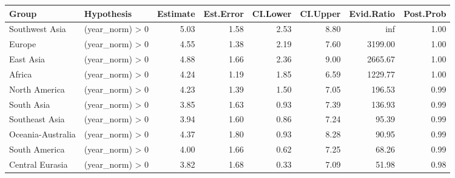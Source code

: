 \begin{tabular}{llrrrrrr}
\toprule
Group & Hypothesis & Estimate & Est.Error & CI.Lower & CI.Upper & Evid.Ratio & Post.Prob \\
\midrule
Southwest Asia & (year_norm) > 0 & 5.03 & 1.58 & 2.53 & 8.80 & inf & 1.00 \\
Europe & (year_norm) > 0 & 4.55 & 1.38 & 2.19 & 7.60 & 3199.00 & 1.00 \\
East Asia & (year_norm) > 0 & 4.88 & 1.66 & 2.36 & 9.00 & 2665.67 & 1.00 \\
Africa & (year_norm) > 0 & 4.24 & 1.19 & 1.85 & 6.59 & 1229.77 & 1.00 \\
North America & (year_norm) > 0 & 4.23 & 1.39 & 1.50 & 7.05 & 196.53 & 0.99 \\
South Asia & (year_norm) > 0 & 3.85 & 1.63 & 0.93 & 7.39 & 136.93 & 0.99 \\
Southeast Asia & (year_norm) > 0 & 3.94 & 1.60 & 0.86 & 7.24 & 95.39 & 0.99 \\
Oceania-Australia & (year_norm) > 0 & 4.37 & 1.80 & 0.93 & 8.28 & 90.95 & 0.99 \\
South America & (year_norm) > 0 & 4.00 & 1.66 & 0.62 & 7.25 & 68.26 & 0.99 \\
Central Eurasia & (year_norm) > 0 & 3.82 & 1.68 & 0.33 & 7.09 & 51.98 & 0.98 \\
\bottomrule
\end{tabular}
